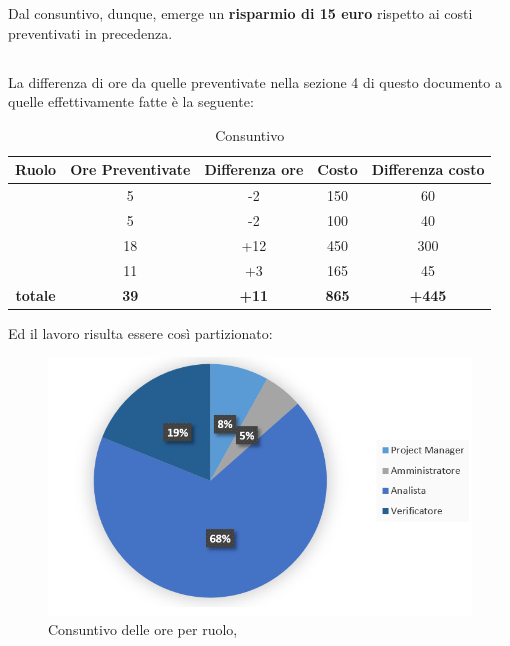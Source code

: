 Dal consuntivo, dunque, emerge un \textbf{risparmio di 15 euro} rispetto ai costi preventivati in precedenza.

\newpage

\subsection{\ARD}
La differenza di ore da quelle preventivate nella sezione 4 di questo documento a quelle effettivamente fatte è la seguente:

\begin{table}[h]
	\begin{center}
		\begin{tabular}{|c|c|c|c|c|}
			\hline
			\textbf{Ruolo}	& \textbf{Ore Preventivate} & \textbf{Differenza ore} & \textbf{Costo} & \textbf{Differenza costo}\\
			\hline
			\Pm &	5  & -2 & 150 & 60	\\
			\hline
			\Am	&	5 & -2 & 100 & 40\\
			\hline
			\An	&	18 & +12 & 450 & 300\\
			\hline
			\Ver &	11 & +3 & 165 & 45\\
			\hline
			\textbf{totale}	&	\textbf{39} & \textbf{+11} & \textbf{865} & \textbf{+445}\\
			\hline
		\end{tabular}
	\end{center}
	\caption{Consuntivo \ARD}
\end{table}

Ed il lavoro risulta essere così partizionato:

\begin{figure}[H]
	\centering 
	\includegraphics[scale=1.25]{Immagini/Consuntivo/ConsuntivoARD.png}
	\caption{Consuntivo delle ore per ruolo, \ARD}
\end{figure}

